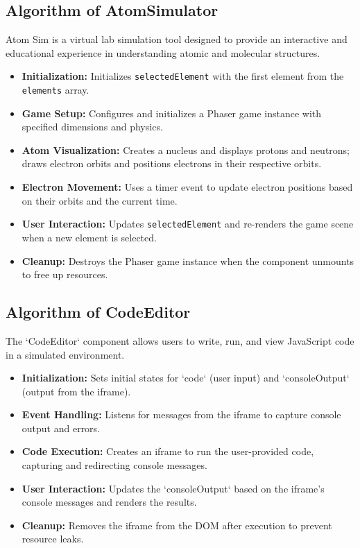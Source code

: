 \subsection{Algorithm of AtomSimulator}
Atom Sim is a virtual lab simulation tool designed to provide an interactive and educational experience in understanding atomic and molecular structures.
\begin{itemize}
    \item \textbf{Initialization:} Initializes \texttt{selectedElement} with the first element from the \texttt{elements} array.
    \item \textbf{Game Setup:} Configures and initializes a Phaser game instance with specified dimensions and physics.
    \item \textbf{Atom Visualization:} Creates a nucleus and displays protons and neutrons; draws electron orbits and positions electrons in their respective orbits.
    \item \textbf{Electron Movement:} Uses a timer event to update electron positions based on their orbits and the current time.
    \item \textbf{User Interaction:} Updates \texttt{selectedElement} and re-renders the game scene when a new element is selected.
    \item \textbf{Cleanup:} Destroys the Phaser game instance when the component unmounts to free up resources.
\end{itemize}


\subsection{Algorithm of CodeEditor}
The `CodeEditor` component allows users to write, run, and view JavaScript code in a simulated environment.
\begin{itemize}
    \item \textbf{Initialization:} Sets initial states for `code` (user input) and `consoleOutput` (output from the iframe).
    \item \textbf{Event Handling:} Listens for messages from the iframe to capture console output and errors.
    \item \textbf{Code Execution:} Creates an iframe to run the user-provided code, capturing and redirecting console messages.
    \item \textbf{User Interaction:} Updates the `consoleOutput` based on the iframe’s console messages and renders the results.
    \item \textbf{Cleanup:} Removes the iframe from the DOM after execution to prevent resource leaks.
\end{itemize}
